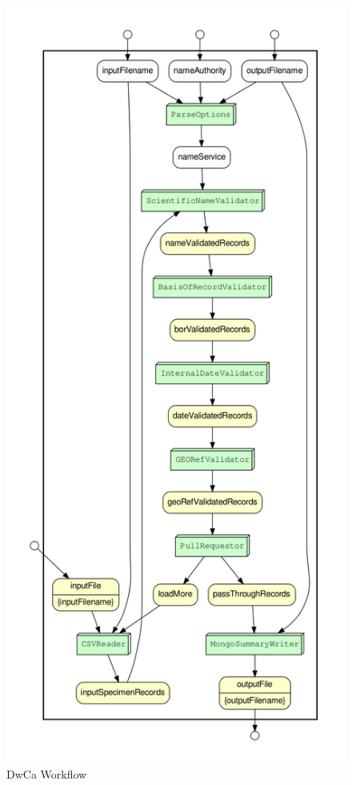 \documentclass{article}
\begin{document}
\begin{figure}[p]
\includegraphics[height=\textheight]{Fig2.png}
\caption{DwCa Workflow}
\label{fig:dwcaWorkflowdia}
\end{figure}
\end{document}
